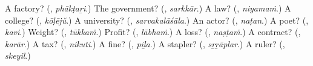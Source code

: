 \begin{tcolorbox}[breakable,colback=teal!4,colframe=teal!35!black,title={Before you move on}]
A factory? (\textbf{}, \emph{phākṭaṟi}.) The government? (\textbf{}, \emph{sarkkār}.) A law? (\textbf{}, \emph{niyamaṁ}.) A college? (\textbf{}, \emph{kōḷējŭ}.) A university? (\textbf{}, \emph{sarvakalāśāla}.) An actor? (\textbf{}, \emph{naṭan}.) A poet? (\textbf{}, \emph{kavi}.) Weight? (\textbf{}, \emph{tūkkaṁ}.) Profit? (\textbf{}, \emph{lābhaṁ}.) A loss? (\textbf{}, \emph{naṣṭaṁ}.) A contract? (\textbf{}, \emph{karār}.) A tax? (\textbf{}, \emph{nikuti}.) A fine? (\textbf{}, \emph{piḻa}.) A stapler? (\textbf{}, \emph{sṟṟāplar}.) A ruler? (\textbf{}, \emph{skeyil}.)
\end{tcolorbox}
